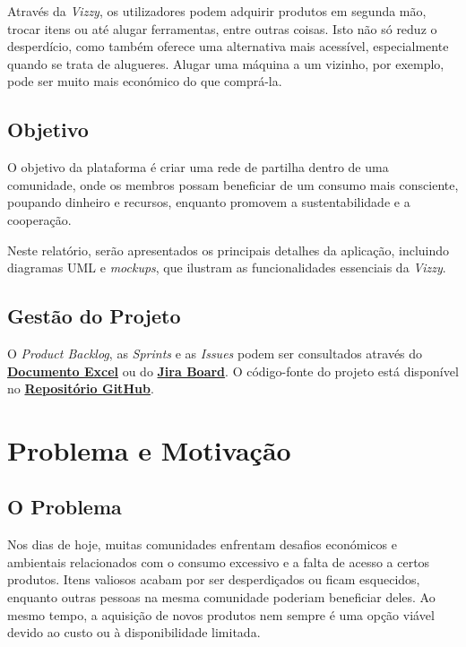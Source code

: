 \documentclass[a4paper, 12pt]{article} %
\begin{document}
Através da \textit{Vizzy}, os utilizadores podem adquirir produtos em segunda mão, trocar itens ou até alugar ferramentas, entre outras coisas. Isto não só reduz o desperdício, como também oferece uma alternativa mais acessível, especialmente quando se trata de alugueres. Alugar uma máquina a um vizinho, por exemplo, pode ser muito mais económico do que comprá-la.

\subsection{Objetivo}
O objetivo da plataforma é criar uma rede de partilha dentro de uma comunidade, onde os membros possam beneficiar de um consumo mais consciente, poupando dinheiro e recursos, enquanto promovem a sustentabilidade e a cooperação.

Neste relatório, serão apresentados os principais detalhes da aplicação, incluindo diagramas UML e \textit{mockups}, que ilustram as funcionalidades essenciais da \textit{Vizzy}.

\subsection{Gestão do Projeto}
O \textit{Product Backlog}, as \textit{Sprints} e as \textit{Issues} podem ser consultados através do \href{https://ipcapt-my.sharepoint.com/:x:/g/personal/nfr\_ipca\_pt/Eb29k3z-aWRGisXGIZopL6IBy5l5QZjY8SjG1iWQDl6c7w?rtime=jE\_b04Za3Ug}{\textbf{Documento Excel}} ou do \href{https://basigraphics.atlassian.net/jira/software/projects/VIZZY/boards/1/backlog?epics=visible&atlOrigin=eyJpIjoiOGNmZTQ2MDRmNjQ1NDY0NDgwNDk0MDJiMGM0MDdlZWYiLCJwIjoiaiJ9}{\textbf{Jira Board}}. O código-fonte do projeto está disponível no \href{https://github.com/Basiiii/Vizzy}{\textbf{Repositório GitHub}}.


\newpage
\section{Problema e Motivação}

\subsection{O Problema}

Nos dias de hoje, muitas comunidades enfrentam desafios económicos e ambientais relacionados com o consumo excessivo e a falta de acesso a certos produtos. Itens valiosos acabam por ser desperdiçados ou ficam esquecidos, enquanto outras pessoas na mesma comunidade poderiam beneficiar deles. Ao mesmo tempo, a aquisição de novos produtos nem sempre é uma opção viável devido ao custo ou à disponibilidade limitada.
\end{document}
